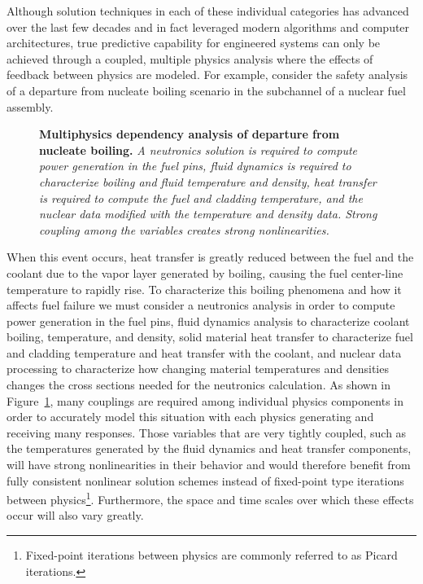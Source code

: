 Although solution techniques in each of these individual categories
has advanced over the last few decades and in fact leveraged modern
algorithms and computer architectures, true predictive capability for
engineered systems can only be achieved through a coupled, multiple
physics analysis where the effects of feedback between physics are
modeled. For example, consider the safety analysis of a departure from
nucleate boiling scenario in the subchannel of a nuclear fuel
assembly.
\begin{figure}[t!]
  \begin{center}
    \scalebox{1.5}{
       }
  \end{center}
  \caption{\textbf{Multiphysics dependency analysis of departure from
      nucleate boiling.} \textit{A neutronics solution is required to
      compute power generation in the fuel pins, fluid dynamics is
      required to characterize boiling and fluid temperature and
      density, heat transfer is required to compute the fuel and
      cladding temperature, and the nuclear data modified with the
      temperature and density data. Strong coupling among the
      variables creates strong nonlinearities.}}
  \label{fig:dnb_example}
\end{figure}
When this event occurs, heat transfer is greatly reduced between the
fuel and the coolant due to the vapor layer generated by boiling,
causing the fuel center-line temperature to rapidly rise. To
characterize this boiling phenomena and how it affects fuel failure we
must consider a neutronics analysis in order to compute power
generation in the fuel pins, fluid dynamics analysis to characterize
coolant boiling, temperature, and density, solid material heat
transfer to characterize fuel and cladding temperature and heat
transfer with the coolant, and nuclear data processing to characterize
how changing material temperatures and densities changes the cross
sections needed for the neutronics calculation. As shown in
Figure~\ref{fig:dnb_example}, many couplings are required among
individual physics components in order to accurately model this
situation with each physics generating and receiving many
responses. Those variables that are very tightly coupled, such as the
temperatures generated by the fluid dynamics and heat transfer
components, will have strong nonlinearities in their behavior and
would therefore benefit from fully consistent nonlinear solution
schemes instead of fixed-point type iterations between
physics\footnote{Fixed-point iterations between physics are commonly
  referred to as Picard iterations.}. Furthermore, the space and time
scales over which these effects occur will also vary greatly.

